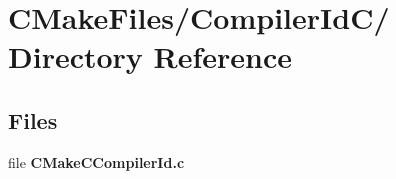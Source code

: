 \section{CMakeFiles/CompilerIdC/ Directory Reference}
\label{dir_ede9e3a469dd3d153b14de4af158fde5}
\subsection*{Files}
\begin{DoxyCompactItemize}
\item 
file {\bf CMakeCCompilerId.c}
\end{DoxyCompactItemize}
